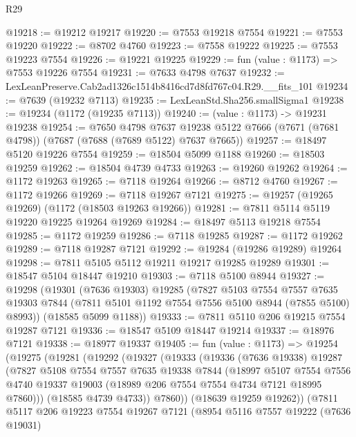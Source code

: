 \begin{lexlean}{R29}
\begin{coremodule}
@19218 := @19212 @19217
@19220 := @7553 @19218 @7554
@19221 := @7553 @19220
@19222 := @8702 @4760
@19223 := @7558 @19222
@19225 := @7553 @19223 @7554
@19226 := @19221 @19225
@19229 := fun (value : @1173) => @7553 @19226 @7554
@19231 := @7633 @4798 @7637
@19232 := LexLeanPreserve.Cab2ad1326c1514b8416cd7d8fd767c04.R29.__fits_101
@19234 := @7639 (@19232 @7113)
@19235 := LexLeanStd.Sha256.smallSigma1
@19238 := @19234 (@1172 (@19235 @7113))
@19240 := (value : @1173) -> @19231 @19238
@19254 := @7650
    @4798
    @7637
    @19238
    @5122
    @7666
    (@7671 (@7681 @4798))
    (@7687 (@7688 (@7689 @5122) @7637 @7665))
@19257 := @18497 @5120 @19226 @7554
@19259 := @18504 @5099 @1188
@19260 := @18503 @19259
@19262 := @18504 @4739 @4733
@19263 := @19260 @19262
@19264 := @1172 @19263
@19265 := @7118 @19264
@19266 := @8712 @4760
@19267 := @1172 @19266
@19269 := @7118 @19267 @7121
@19275 := @19257 (@19265 @19269) (@1172 (@18503 @19263 @19266))
@19281 := @7811 @5114 @5119 @19220 @19225 @19264 @19269
@19284 := @18497 @5113 @19218 @7554
@19285 := @1172 @19259
@19286 := @7118 @19285
@19287 := @1172 @19262
@19289 := @7118 @19287 @7121
@19292 := @19284 (@19286 @19289) @19264
@19298 := @7811 @5105 @5112 @19211 @19217 @19285 @19289
@19301 := @18547 @5104 @18447 @19210
@19303 := @7118 @5100 @8944
@19327 := @19298
    (@19301
      (@7636 @19303)
      @19285
      (@7827
        @5103
        @7554
        @7557
        @7635
        @19303
        @7844
        (@7811 @5101 @1192 @7554 @7556 @5100 @8944 (@7855 @5100) @8993))
      (@18585 @5099 @1188))
@19333 := @7811 @5110 @206 @19215 @7554 @19287 @7121
@19336 := @18547 @5109 @18447 @19214
@19337 := @18976 @7121
@19338 := @18977 @19337
@19405 := fun (value : @1173) =>
  @19254
    (@19275
      (@19281
        (@19292
          (@19327
            (@19333
              (@19336
                (@7636 @19338)
                @19287
                (@7827
                  @5108
                  @7554
                  @7557
                  @7635
                  @19338
                  @7844
                  (@18997
                    @5107
                    @7554
                    @7556
                    @4740
                    @19337
                    @19003
                    (@18989 @206 @7554 @7554 @4734 @7121 @18995 @7860)))
                (@18585 @4739 @4733))
              @7860))
          (@18639 @19259 @19262))
        (@7811
          @5117
          @206
          @19223
          @7554
          @19267
          @7121
          (@8954
            @5116
            @7557
            @19222
            (@7636 @19031)

\end{coremodule}
\end{lexlean}
